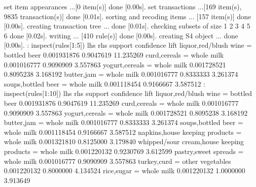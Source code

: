 \documentclass[10pt,a4paper]{article}
\begin{document}
set item appearances ...[0 item(s)] done [0.00s].
\newline
set transactions ...[169 item(s), 9835 transaction(s)] done [0.01s].
\newline
sorting and recoding items ... [157 item(s)] done [0.00s].
\newline
creating transaction tree ... done [0.01s].
\newline
checking subsets of size 1 2 3 4 5 6 done [0.02s].
\newline
writing ... [410 rule(s)] done [0.00s].
\newline
creating S4 object  ... done [0.00s].
\newline
: inspect(rules[1:5])
\newline
lhs                        rhs            support     confidence lift     
 {liquor,red/blush wine} = {bottled beer} 0.001931876 0.9047619  11.235269
 {curd,cereals}          = {whole milk}   0.001016777 0.9090909   3.557863
 {yogurt,cereals}        = {whole milk}   0.001728521 0.8095238   3.168192
 {butter,jam}            = {whole milk}   0.001016777 0.8333333   3.261374
 {soups,bottled beer}    = {whole milk}   0.001118454 0.9166667   3.587512
\newline
: inspect(rules[1:10])
\newline
lhs                                            rhs                support     confidence lift     
  {liquor,red/blush wine}                     = {bottled beer}     0.001931876 0.9047619  11.235269
  {curd,cereals}                              = {whole milk}       0.001016777 0.9090909   3.557863
  {yogurt,cereals}                            = {whole milk}       0.001728521 0.8095238   3.168192
  {butter,jam}                                = {whole milk}       0.001016777 0.8333333   3.261374
  {soups,bottled beer}                        = {whole milk}       0.001118454 0.9166667   3.587512
  {napkins,house keeping products}            = {whole milk}       0.001321810 0.8125000   3.179840
  {whipped/sour cream,house keeping products} = {whole milk}       0.001220132 0.9230769   3.612599
  {pastry,sweet spreads}                      = {whole milk}       0.001016777 0.9090909   3.557863
  {turkey,curd}                               = {other vegetables} 0.001220132 0.8000000   4.134524
 {rice,sugar}                                = {whole milk}       0.001220132 1.0000000   3.913649
\end{document}
